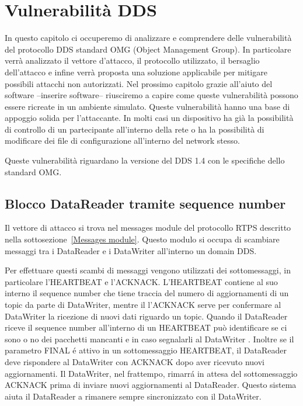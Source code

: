 \chapter{Vulnerabilità DDS}


In questo capitolo ci occuperemo di analizzare e comprendere delle vulnerabilità
del protocollo DDS standard OMG (Object Management Group). In particolare
verrà analizzato il vettore d'attacco, il protocollo utilizzato, il bersaglio
dell'attacco e infine verrà proposta una soluzione applicabile per
mitigare possibili attacchi non autorizzati. Nel prossimo capitolo grazie all'aiuto
del software --inserire software-- riusciremo a capire come queste vulnerabilità
possono essere ricreate in un ambiente simulato.
Queste vulnerabilità hanno una base di appoggio solida per 
l'attaccante. In molti casi un dispositivo ha già la possibilità di controllo
di un partecipante all'interno della rete o ha la possibilità di modificare
dei file di configurazione all'interno del network stesso.

Queste vulnerabilità riguardano la versione del DDS 1.4 con le specifiche 
dello standard OMG.




\section{Blocco DataReader tramite sequence number}

Il vettore di attacco si trova nel messages module del protocollo RTPS
descritto nella sottosezione~\ref{Messages module}. Questo modulo
si occupa di scambiare messaggi tra i DataReader e i DataWriter 
all'interno un domain DDS.

Per effettuare questi scambi di messaggi vengono utilizzati dei sottomessaggi,
in particolare l'HEARTBEAT e l'ACKNACK.
L'HEARTBEAT contiene al suo interno il sequence number che tiene traccia 
del numero di aggiornamenti di un topic da parte di DataWriter, mentre il
l'ACKNACK serve per confermare al DataWriter la ricezione di nuovi dati 
riguardo un topic.
Quando il DataReader riceve il sequence number all'interno di un HEARTBEAT
può identificare se ci sono o no dei pacchetti mancanti e in caso segnalarli al
DataWriter \cite{White2017AnII}.
Inoltre se il parametro FINAL é attivo in un sottomessaggio HEARTBEAT, il DataReader 
deve rispondere al DataWriter con ACKNACK dopo aver ricevuto nuovi aggiornamenti.
Il DataWriter, nel frattempo, rimarrá in attesa del sottomessaggio 
ACKNACK prima di 
inviare nuovi aggiornamenti al DataReader.
Questo sistema aiuta il DataReader a rimanere sempre sincronizzato con il 
DataWriter.

